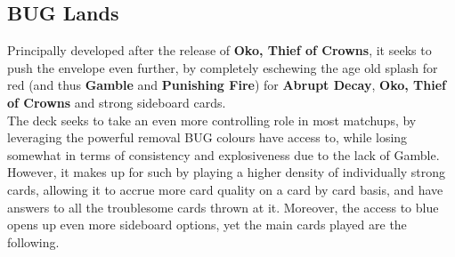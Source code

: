 \documentclass{report}
\begin{document}
\subsection{BUG Lands}
Principally developed after the release of \textbf{Oko, Thief of Crowns}, it seeks to push the envelope even further, by completely eschewing the age old splash for red (and thus \textbf{Gamble} and \textbf{Punishing Fire}) for \textbf{Abrupt Decay}, \textbf{Oko, Thief of Crowns} and strong sideboard cards.\\The deck seeks to take an even more controlling role in most matchups, by leveraging the powerful removal BUG colours have access to, while losing somewhat in terms of consistency and explosiveness due to the lack of Gamble. \\However, it makes up for such by playing a higher density of individually strong cards, allowing it to accrue more card quality on a card by card basis, and have answers to all the troublesome cards thrown at it. Moreover, the access to blue opens up even more sideboard options, yet the main cards played are the following.\\
\end{document}
